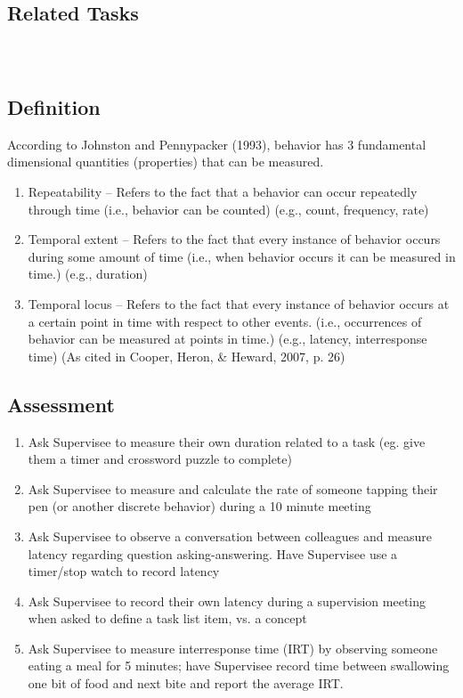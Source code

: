 \subsection{Related Tasks}
\fourdThirteen{}\\
%
%
%
%
%
%
%
%
\section[\fourFKFourtySeven{}]{\fourFKFourtySeven{}%
              }
\subsection{Definition}
According to Johnston and Pennypacker (1993), behavior has 3 fundamental dimensional quantities (properties) that can be measured.
\begin{enumerate}
\item Repeatability – Refers to the fact that a behavior can occur repeatedly through time (i.e., behavior can be counted) (e.g., count, frequency, rate)
\item Temporal extent – Refers to the fact that every instance of behavior occurs during some amount of time (i.e., when behavior occurs it can be measured in time.) (e.g., duration)
\item Temporal locus – Refers to the fact that every instance of behavior occurs at a certain point in time with respect to other events. (i.e., occurrences of behavior can be measured at points in time.) (e.g., latency, interresponse time) (As cited in Cooper, Heron, \& Heward, 2007, p. 26)
\end{enumerate}
%
\subsection{Assessment}
\begin{enumerate}
\item Ask Supervisee to measure their own duration related to a task (eg. give them a timer and crossword puzzle to complete)
\item Ask Supervisee to measure and calculate the rate of someone tapping their pen (or another discrete behavior) during a 10 minute meeting
\item Ask Supervisee to observe a conversation between colleagues and measure latency regarding question asking-answering.  Have Supervisee use a timer/stop watch to record latency
\item Ask Supervisee to record their own latency during a supervision meeting when asked to define a task list item, vs. a concept 
\item Ask Supervisee to measure interresponse time (IRT) by observing someone eating a meal for 5 minutes; have Supervisee record time between swallowing one bit of food and next bite and report the average IRT.
%
\end{enumerate}
%
